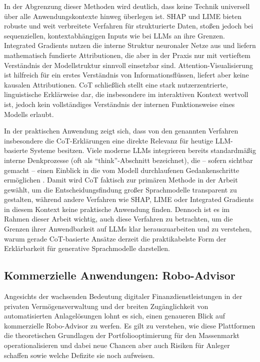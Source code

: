     In der Abgrenzung dieser Methoden wird deutlich, dass keine Technik universell über alle Anwendungskontexte hinweg überlegen ist.
    \acs{SHAP} und \acs{LIME} bieten robuste und weit verbreitete Verfahren für strukturierte Daten, stoßen jedoch bei sequenziellen, kontextabhängigen Inputs wie bei \acs{LLM}s an ihre Grenzen.
    Integrated Gradients nutzen die interne Struktur neuronaler Netze aus und liefern mathematisch fundierte Attributionen, die aber in der Praxis nur mit vertieftem Verständnis der Modellstruktur sinnvoll einsetzbar sind.
    Attention-Visualisierung ist hilfreich für ein erstes Verständnis von Informationsflüssen, liefert aber keine kausalen Attributionen.
    \acs{CoT} schließlich stellt eine stark nutzerzentrierte, linguistische Erklärweise dar, die insbesondere im interaktiven Kontext wertvoll ist, jedoch kein vollständiges Verständnis der internen Funktionsweise eines Modells erlaubt.

    In der praktischen Anwendung zeigt sich, dass von den genannten Verfahren insbesondere die \acs{CoT}-Erklärungen eine direkte Relevanz für heutige \acs{LLM}-basierte Systeme besitzen.
    Viele moderne \acs{LLM}s integrieren bereits standardmäßig interne Denkprozesse (oft als \enquote{think}-Abschnitt bezeichnet), die -- sofern sichtbar gemacht -- einen Einblick in die vom Modell durchlaufenen Gedankenschritte ermöglichen \autocite{openai2024reasoning}.
    Damit wird \acs{CoT} faktisch zur primären Methode in der Arbeit gewählt, um die Entscheidungsfindung großer Sprachmodelle transparent zu gestalten, während andere Verfahren wie \acs{SHAP}, \acs{LIME} oder Integrated Gradients in diesem Kontext keine praktische Anwendung finden.
    Dennoch ist es im Rahmen dieser Arbeit wichtig, auch diese Verfahren zu betrachten, um die Grenzen ihrer Anwendbarkeit auf \acs{LLM}s klar herauszuarbeiten und zu verstehen, warum gerade \acs{CoT}-basierte Ansätze derzeit die praktikabelste Form der Erklärbarkeit für generative Sprachmodelle darstellen.


  \subsection{Kommerzielle Anwendungen: Robo-Advisor}

    Angesichts der wachsenden Bedeutung digitaler Finanzdienstleistungen in der privaten Vermögensverwaltung und der breiten Zugänglichkeit von automatisierten Anlagelösungen lohnt es sich, einen genaueren Blick auf kommerzielle Robo-Advisor zu werfen.
    Es gilt zu verstehen, wie diese Plattformen die theoretischen Grundlagen der Portfoliooptimierung für den Massenmarkt operationalisieren und dabei neue Chancen aber auch Risiken für Anleger schaffen sowie welche Defizite sie noch aufweisen.

